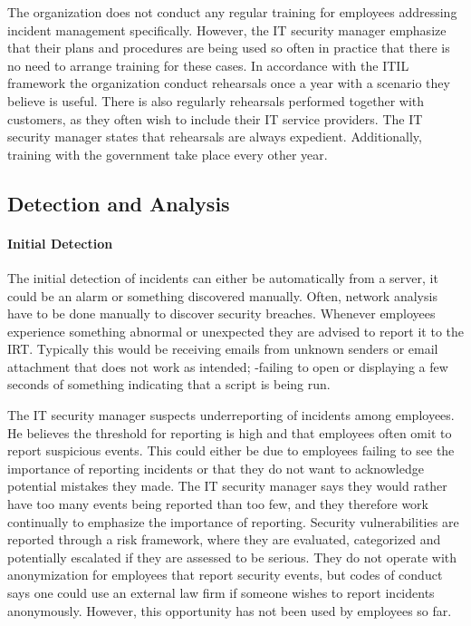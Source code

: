 The organization does not conduct any regular training for employees addressing incident management specifically. However, the IT security manager emphasize that their plans and procedures are being used so often in practice that there is no need to arrange training for these cases. 
In accordance with the ITIL framework the organization conduct rehearsals once a year with a scenario they believe is useful. There is also regularly rehearsals performed together with customers, as they often wish to include their IT service providers. The IT security manager states that rehearsals are always expedient. Additionally, training with the government take place every other year. 

\subsection{Detection and Analysis}
\paragraph{Initial Detection}
The initial detection of incidents can either be automatically from a server, it could be an alarm or something discovered manually. Often, network analysis have to be done manually to discover security breaches. Whenever employees experience something abnormal or unexpected they are advised to report it to the \ac{IRT}. Typically this would be receiving emails from unknown senders or email attachment that does not work as intended; -failing to open or displaying a few seconds of something indicating that a script is being run.

The IT security manager suspects underreporting of incidents among employees. He believes the threshold for reporting is high and that employees often omit to report suspicious events. This could either be due to employees failing to see the importance of reporting incidents or that they do not want to acknowledge potential mistakes they made. The IT security manager says they would rather have too many events being reported than too few, and they therefore work continually to emphasize the importance of reporting.
Security vulnerabilities are reported through a risk framework, where they are evaluated, categorized and potentially escalated if they are assessed to be serious. They do not operate with anonymization for employees that report security events, but codes of conduct says one could use an external law firm if someone wishes to report incidents anonymously. However, this opportunity has not been used by employees so far. 


